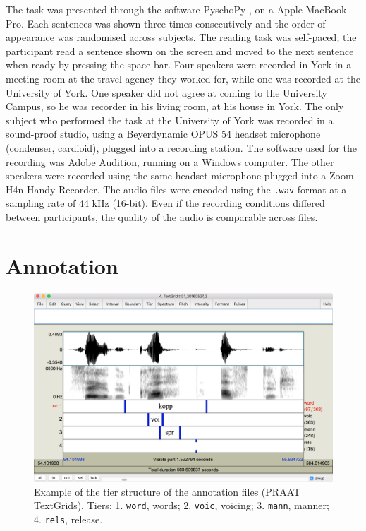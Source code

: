 \documentclass[11pt,a4paper,openany]{memoir}\usepackage[]{graphicx}\usepackage[]{color}
\begin{document}
The task was presented through the software PyschoPy \citep{peirce2009}, on a Apple MacBook Pro.
Each sentences was shown three times consecutively and the order of appearance was randomised across subjects.
The reading task was self-paced; the participant read a sentence shown on the screen and moved to the next sentence when ready by pressing the space bar.
Four speakers were recorded in York in a meeting room at the travel agency they worked for, while one was recorded at the University of York.
One speaker did not agree at coming to the University Campus, so he was recorder in his living room, at his house in York.
The only subject who performed the task at the University of York was recorded in a sound-proof studio, using a Beyerdynamic OPUS 54 headset microphone (condenser, cardioid), plugged into a recording station.
The software used for the recording was Adobe Audition, running on a Windows computer.
The other speakers were recorded using the same headset microphone plugged into a Zoom H4n Handy Recorder.
The audio files were encoded using the \texttt{.wav} format at a sampling rate of 44 kHz (16-bit).
Even if the recording conditions differed between participants, the quality of the audio is comparable across files.

\section{Annotation}
\label{s:annotation}

\begin{figure}
\centering
\includegraphics[width=\textwidth]{textgrid}
\caption{Example of the tier structure of the annotation files (PRAAT TextGrids). Tiers: 1. \texttt{word}, words; 2. \texttt{voic}, voicing; 3. \texttt{mann}, manner; 4. \texttt{rels}, release.}
\label{f:textgrid}
\end{figure}
\end{document}

